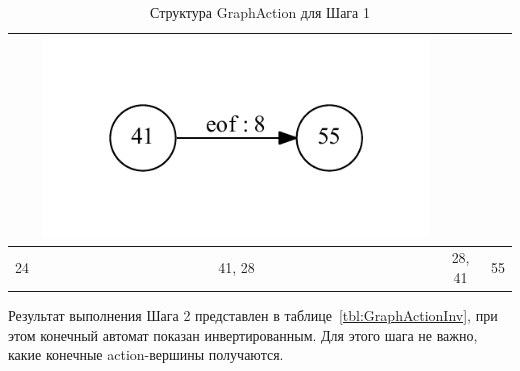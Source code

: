 \begin{table}[h]
\begin{tabular}{ | c | c | c | c | }
\begin{minipage}{.22\textwidth}
    \end{minipage}
    & 
    \begin{minipage}{.22\textwidth}
      \includegraphics[width=\linewidth]{Polubelova/41_tok}
    \end{minipage}    
    \\ \hline
    24 & 41, 28 & 28, 41 & 55
    \\ \hline
  \end{tabular}
  \caption{Структура GraphAction для Шага 1}
  \label{tbl:GraphAction}
\end{table}

Результат выполнения Шага 2 представлен в таблице~\ref{tbl:GraphActionInv}, при этом конечный автомат показан инвертированным. Для этого шага не важно, какие конечные action-вершины получаются.

